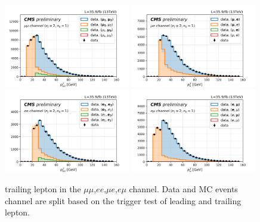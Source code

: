\begin{figure}[h!]
  \centering
  \includegraphics[width=0.49\textwidth]{chapters/Appendix/sectionTriggerTest/figures/trgLep_mumu.png}
  \includegraphics[width=0.49\textwidth]{chapters/Appendix/sectionTriggerTest/figures/trgLep_emu.png}
  \includegraphics[width=0.49\textwidth]{chapters/Appendix/sectionTriggerTest/figures/trgLep_ee.png}
  \includegraphics[width=0.49\textwidth]{chapters/Appendix/sectionTriggerTest/figures/trgLep_emu2.png}
  \caption{trailing lepton \pt in the $\mu\mu$,$ee$,$\mu e$,$e\mu$ channel. Data and MC events channel are split 
  based on the trigger test of leading and trailing lepton.
  \label{fig:triggerTest}}
\end{figure}
\FloatBarrier
